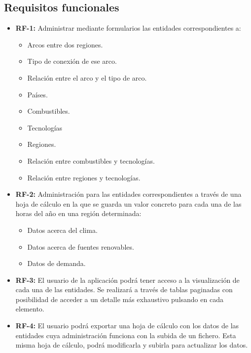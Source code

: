 \subsection{Requisitos funcionales}

\begin{itemize}
	
	\item \textbf{RF-1:} Administrar mediante formularios las entidades correspondientes a: 

		\begin{itemize}
			
			\item Arcos entre dos regiones.
			\item Tipo de conexión de ese arco.
			\item Relación entre el arco y el tipo de arco.
			\item Países.
			\item Combustibles.
			\item Tecnologías
			\item Regiones.
			\item Relación entre combustibles y tecnologías.
			\item Relación entre regiones y tecnologías.
			
		\end{itemize}
	
	\item \textbf{RF-2:} Administración para las entidades correspondientes a través de una hoja de cálculo en la que se guarda un valor concreto para cada una de las horas del año en una región determinada:
	
		\begin{itemize}
			
			\item Datos acerca del clima.
			\item Datos acerca de fuentes renovables.
			\item Datos de demanda.
			
		\end{itemize}
	
	\item \textbf{RF-3:} El usuario de la aplicación podrá tener acceso a la visualización de cada una de las entidades. Se realizará a través de tablas paginadas con posibilidad de acceder a un detalle más exhaustivo pulsando en cada elemento.
	
	\item \textbf{RF-4:} El usuario podrá exportar una hoja de cálculo con los datos de las entidades cuya administración funciona con la subida de un fichero. Esta misma hoja de cálculo, podrá modificarla y subirla para actualizar los datos.
	

\end{itemize}
